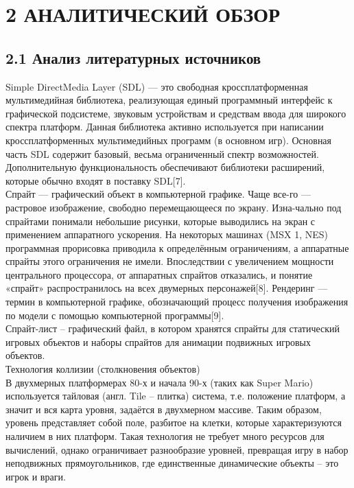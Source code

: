 \documentclass[14pt,a4paper]{extreport}
\begin{document}
	\section*{\normalsize\hspace{4ex}2 АНАЛИТИЧЕСКИЙ ОБЗОР}
	\subsection*{\normalsize\hspace{4ex}2.1 Анализ литературных источников}
	\hspace{4ex}Simple DirectMedia Layer (SDL) — это свободная кроссплатформенная мультимедийная библиотека, реализующая единый программный интерфейс к графической подсистеме, звуковым устройствам и средствам ввода для широкого спектра платформ. Данная библиотека активно используется при написании кроссплатформенных мультимедийных программ (в основном игр). Основная часть SDL содержит базовый, весьма ограниченный спектр возможностей. Дополнительную функциональность обеспечивают библиотеки расширений, которые обычно входят в поставку SDL[7].
\\\hspace{4ex}Спрайт — графический объект в компьютерной графике. Чаще все-го — растровое изображение, свободно перемещающееся по экрану. Изна-чально под спрайтами понимали небольшие рисунки, которые выводились на экран с применением аппаратного ускорения. На некоторых машинах (MSX 1, NES) программная прорисовка приводила к определённым ограничениям, а аппаратные спрайты этого ограничения не имели. Впоследствии с увеличением мощности центрального процессора, от аппаратных спрайтов отказались, и понятие «спрайт» распространилось на всех двумерных персонажей[8]. 
Рендеринг — термин в компьютерной графике, обозначающий процесс получения изображения по модели с помощью компьютерной программы[9].
\\\hspace{4ex}Спрайт-лист – графический файл, в котором хранятся спрайты для статический игровых объектов и наборы спрайтов для анимации подвижных игровых объектов.
\\\hspace{4ex}Технология коллизии (столкновения объектов)
\\В двухмерных платформерах 80-х и начала 90-х  (таких как Super Mario) используется тайловая (англ. Tile – плитка) система, т.е. положение платформ, а значит и вся карта уровня, задаётся в двухмерном массиве. Таким образом, уровень представляет собой поле, разбитое на клетки, которые характеризуются наличием в них платформ. Такая технология не требует много ресурсов для вычислений, однако ограничивает разнообразие уровней, превращая игру в набор неподвижных прямоугольников, где единственные динамические объекты – это игрок и враги.
\end{document}
